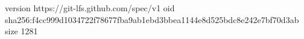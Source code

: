 version https://git-lfs.github.com/spec/v1
oid sha256:f4cc999d1034722f78677fba9ab1ebd3bbea1144e8d525bdc8e242e7bf70d3ab
size 1281
